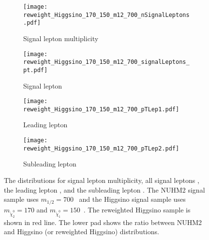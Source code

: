 \begin{figure}[htbp]
    \begin{center}
        \begin{subfigure}[b]{0.48\textwidth}
            \texttt{[image: reweight\_Higgsino\_170\_150\_m12\_700\_nSignalLeptons.pdf]}
            \caption{Signal lepton multiplicity}
        \end{subfigure}
        \begin{subfigure}[b]{0.48\textwidth}
            \texttt{[image: reweight\_Higgsino\_170\_150\_m12\_700\_signalLeptons\_pt.pdf]}
            \caption{Signal lepton \pt}
        \end{subfigure}
        \begin{subfigure}[b]{0.48\textwidth}
            \texttt{[image: reweight\_Higgsino\_170\_150\_m12\_700\_pTLep1.pdf]}
            \caption{Leading lepton \pt}
        \end{subfigure}
        \begin{subfigure}[b]{0.48\textwidth}
            \texttt{[image: reweight\_Higgsino\_170\_150\_m12\_700\_pTLep2.pdf]}
            \caption{Subleading lepton \pt}
        \end{subfigure}
    \end{center}
    \caption{The distributions for signal lepton multiplicity, all signal leptons \pt, the leading lepton \pt, and the subleading lepton \pt.
    The NUHM2 signal sample uses  $m_{1/2} = 700$~{\GeV} and the Higgsino signal sample uses $m_{\widetilde{\chi}^{0}_{2}} = 170$ and $m_{\widetilde{\chi}^{0}_{1}} = 150$~{\GeV}.
    The reweighted Higgsino sample is shown in red line.
    The lower pad shows the ratio between NUHM2 and Higgsino (or reweighted Higgsino) distributions.}
    \label{fig:results_nuhm2_reweighting_validation_1}
\end{figure}

